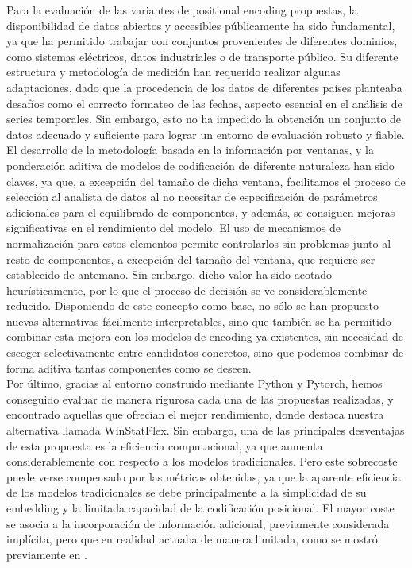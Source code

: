 Para la evaluación de las variantes de positional encoding propuestas, la disponibilidad de datos abiertos y accesibles públicamente ha sido fundamental, ya que ha permitido trabajar con conjuntos provenientes de diferentes dominios, como sistemas eléctricos, datos industriales o de transporte público. Su diferente estructura y metodología de medición han requerido realizar algunas adaptaciones, dado que la procedencia de los datos de diferentes países planteaba desafíos como el correcto formateo de las fechas, aspecto esencial en el análisis de series temporales. Sin embargo, esto no ha impedido la obtención un conjunto de datos adecuado y suficiente para lograr un entorno de evaluación robusto y fiable.\\

El desarrollo de la metodología basada en la información por ventanas, y la ponderación aditiva de modelos de codificación de diferente naturaleza han sido claves, ya que, a excepción del tamaño de dicha ventana, facilitamos el proceso de selección al analista de datos al no necesitar de especificación de parámetros adicionales para el equilibrado de componentes, y además, se consiguen mejoras significativas en el rendimiento del modelo. El uso de mecanismos de normalización para estos elementos permite controlarlos sin problemas junto al resto de componentes, a excepción del tamaño del ventana, que requiere ser establecido de antemano. Sin embargo, dicho valor ha sido acotado heurísticamente, por lo que el proceso de decisión se ve considerablemente reducido.
Disponiendo de este concepto como base, no sólo se han propuesto nuevas alternativas fácilmente interpretables, sino que también se ha permitido combinar esta mejora con los modelos de encoding ya existentes, sin necesidad de escoger selectivamente entre candidatos concretos, sino que podemos combinar de forma aditiva tantas componentes como se deseen.\\

Por último, gracias al entorno construido mediante Python y Pytorch, hemos conseguido evaluar de manera rigurosa cada una de las propuestas realizadas, y encontrado aquellas que ofrecían el mejor rendimiento, donde destaca nuestra alternativa llamada WinStatFlex. Sin embargo, una de las principales desventajas de esta propuesta es la eficiencia computacional, ya que aumenta considerablemente con respecto a los modelos tradicionales. Pero este sobrecoste puede verse compensado por las métricas obtenidas, ya que la aparente eficiencia de los modelos tradicionales se debe principalmente a la simplicidad de su embedding y la limitada capacidad de la codificación posicional. El mayor coste se asocia a la incorporación de información adicional, previamente considerada implícita, pero que en realidad actuaba de manera limitada, como se mostró previamente en \cite{zeng2022transformerseffectivetimeseries}.\\

